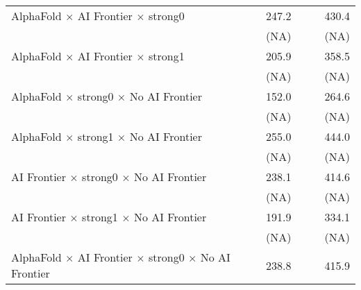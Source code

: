 \begin{tabular}{lcccccc}
   AlphaFold $\times$ AI Frontier $\times$ strong0                            &                        &        & 247.2  &                        &        & 430.4\\   
                                                                              &                        &        & (NA)   &                        &        & (NA)\\   
   AlphaFold $\times$ AI Frontier $\times$ strong1                            &                        &        & 205.9  &                        &        & 358.5\\   
                                                                              &                        &        & (NA)   &                        &        & (NA)\\   
   AlphaFold $\times$ strong0 $\times$ No AI Frontier                         &                        &        & 152.0  &                        &        & 264.6\\   
                                                                              &                        &        & (NA)   &                        &        & (NA)\\   
   AlphaFold $\times$ strong1 $\times$ No AI Frontier                         &                        &        & 255.0  &                        &        & 444.0\\   
                                                                              &                        &        & (NA)   &                        &        & (NA)\\   
   AI Frontier $\times$ strong0 $\times$ No AI Frontier                       &                        &        & 238.1  &                        &        & 414.6\\   
                                                                              &                        &        & (NA)   &                        &        & (NA)\\   
   AI Frontier $\times$ strong1 $\times$ No AI Frontier                       &                        &        & 191.9  &                        &        & 334.1\\   
                                                                              &                        &        & (NA)   &                        &        & (NA)\\   
   AlphaFold $\times$ AI Frontier $\times$ strong0 $\times$ No AI Frontier    &                        &        & 238.8  &                        &        & 415.9\\   

\end{tabular}
